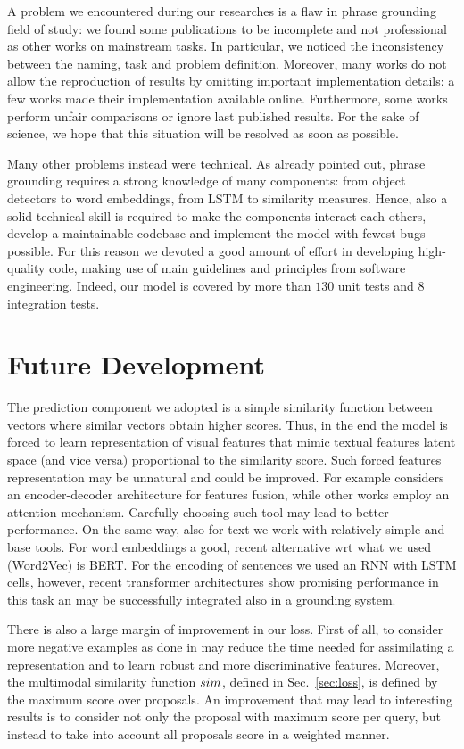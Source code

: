 A problem we encountered during our researches is a flaw in phrase
grounding field of study: we found some publications to be incomplete
and not professional as other works on mainstream tasks. In
particular, we noticed the inconsistency between the naming, task and
problem definition. Moreover, many works do not allow the reproduction
of results by omitting important implementation details: a few works
made their implementation available online. Furthermore, some works
perform unfair comparisons or ignore last published results. For the
sake of science, we hope that this situation will be resolved as soon
as possible.

Many other problems instead were technical. As already pointed out,
phrase grounding requires a strong knowledge of many components: from
object detectors to word embeddings, from LSTM to similarity measures.
Hence, also a solid technical skill is required to make the components
interact each others, develop a maintainable codebase and implement
the model with fewest bugs possible. For this reason we devoted a good
amount of effort in developing high-quality code, making use of main
guidelines and principles from software engineering. Indeed, our model
is covered by more than $130$ unit tests and $8$ integration tests.

\section{Future Development}

The prediction component we adopted is a simple similarity function
between vectors where similar vectors obtain higher scores. Thus, in
the end the model is forced to learn representation of visual features
that mimic textual features latent space (and vice versa) proportional
to the similarity score. Such forced features representation may be
unnatural and could be improved. For example
\cite{datta2019align2ground} considers an encoder-decoder architecture
for features fusion, while other works employ an attention mechanism.
Carefully choosing such tool may lead to better performance. On the
same way, also for text we work with relatively simple and base tools.
For word embeddings a good, recent alternative wrt what we used
(Word2Vec) is BERT. For the encoding of sentences we used an RNN with
LSTM cells, however, recent transformer architectures show promising
performance in this task an may be successfully integrated also in a
grounding system.

There is also a large margin of improvement in our loss. First of all,
to consider more negative examples as done in \cite{wang2020maf} may
reduce the time needed for assimilating a representation and to learn
robust and more discriminative features. Moreover, the multimodal
similarity function $sim$, defined in Sec.~\ref{sec:loss}, is
defined by the maximum score over proposals. An improvement that may
lead to interesting results is to consider not only the proposal with
maximum score per query, but instead to take into account all
proposals score in a weighted manner.

